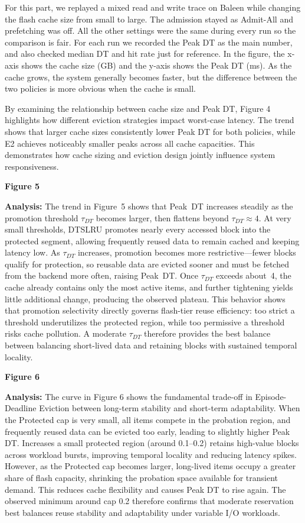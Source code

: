 For this part, we replayed a mixed read and write trace on Baleen while changing the flash cache size from small to large. The admission stayed as Admit-All and prefetching was off. All the other settings were the same during every run so the comparison is fair. For each run we recorded the Peak DT as the main number, and also checked median DT and hit rate just for reference. In the figure, the x-axis shows the cache size (GB) and the y-axis shows the Peak DT (ms). As the cache grows, the system generally becomes faster, but the difference between the two policies is more obvious when the cache is small.

By examining the relationship between cache size and Peak DT, Figure 4 highlights how different eviction strategies impact worst-case latency. The trend shows that larger cache sizes consistently lower Peak DT for both policies, while E2 achieves noticeably smaller peaks across all cache capacities. This demonstrates how cache sizing and eviction design jointly influence system responsiveness.



\textbf{Figure 5}

\textbf{Analysis:} 
The trend in Figure~5 shows that Peak~DT increases steadily as the promotion threshold $\tau_{DT}$ becomes larger, then flattens beyond $\tau_{DT}\approx4$. 
At very small thresholds, DT\textendash SLRU promotes nearly every accessed block into the protected segment, allowing frequently reused data to remain cached and keeping latency low. 
As $\tau_{DT}$ increases, promotion becomes more restrictive—fewer blocks qualify for protection, so reusable data are evicted sooner and must be fetched from the backend more often, raising Peak~DT. 
Once $\tau_{DT}$ exceeds about~4, the cache already contains only the most active items, and further tightening yields little additional change, producing the observed plateau. 
This behavior shows that promotion selectivity directly governs flash-tier reuse efficiency: too strict a threshold underutilizes the protected region, while too permissive a threshold risks cache pollution. 
A moderate $\tau_{DT}$ therefore provides the best balance between balancing short-lived data and retaining blocks with sustained temporal locality.

\textbf{Figure 6}

\textbf{Analysis:} 
The curve in Figure 6 shows the fundamental trade-off in Episode-Deadline Eviction between long-term stability and short-term adaptability.  
When the Protected cap is very small, all items compete in the probation region, and frequently reused data can be evicted too early, leading to slightly higher Peak DT.  
Increases a small protected region (around 0.1–0.2) retains high-value blocks across workload bursts, improving temporal locality and reducing latency spikes.  
However, as the Protected cap becomes larger, long-lived items occupy a greater share of flash capacity, shrinking the probation space available for transient demand.  
This reduces cache flexibility and causes Peak DT to rise again.  
The observed minimum around cap 0.2 therefore confirms that moderate reservation best balances reuse stability and adaptability under variable I/O workloads.

